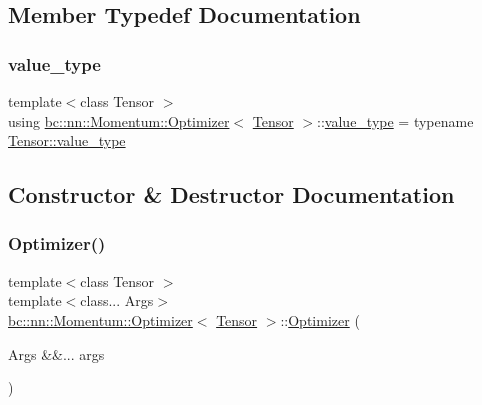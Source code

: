 \subsection{Member Typedef Documentation}
\mbox{\label{structbc_1_1nn_1_1Momentum_1_1Optimizer_a53cb161fe0dd2fa29c1647d36e424d35}} 
\subsubsection{\texorpdfstring{value\+\_\+type}{value\_type}}
{\footnotesize\ttfamily template$<$class Tensor $>$ \\
using \hyperlink{structbc_1_1nn_1_1Momentum_1_1Optimizer}{bc\+::nn\+::\+Momentum\+::\+Optimizer}$<$ \hyperlink{namespacebc_a659391e47ab612be3ba6c18cf9c89159}{Tensor} $>$\+::\hyperlink{structbc_1_1nn_1_1Momentum_1_1Optimizer_a53cb161fe0dd2fa29c1647d36e424d35}{value\+\_\+type} =  typename \hyperlink{classbc_1_1tensors_1_1Tensor__Base_ae7e5c0119f62f43ef74c5a463d3eaf13}{Tensor\+::value\+\_\+type}}



\subsection{Constructor \& Destructor Documentation}
\mbox{\label{structbc_1_1nn_1_1Momentum_1_1Optimizer_a3d02f515c3cc2724dceb35ff0932b173}} 
\subsubsection{\texorpdfstring{Optimizer()}{Optimizer()}}
{\footnotesize\ttfamily template$<$class Tensor $>$ \\
template$<$class... Args$>$ \\
\hyperlink{structbc_1_1nn_1_1Momentum_1_1Optimizer}{bc\+::nn\+::\+Momentum\+::\+Optimizer}$<$ \hyperlink{namespacebc_a659391e47ab612be3ba6c18cf9c89159}{Tensor} $>$\+::\hyperlink{structbc_1_1nn_1_1Momentum_1_1Optimizer}{Optimizer} (\begin{DoxyParamCaption}\item[{Args \&\&...}]{args }\end{DoxyParamCaption})\hspace{0.3cm}{\ttfamily [inline]}}



